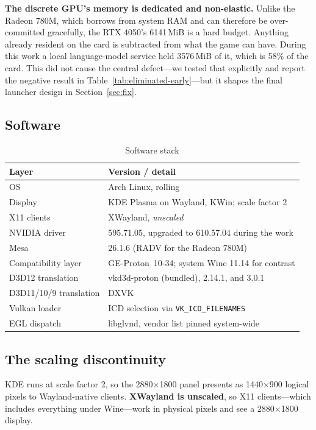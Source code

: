 \textbf{The discrete GPU's memory is dedicated and non-elastic.} Unlike the
Radeon 780M, which borrows from system RAM and can therefore be over-committed
gracefully, the RTX 4050's 6141\,MiB is a hard budget. Anything already resident
on the card is subtracted from what the game can have. During this work a local
language-model service held 3576\,MiB of it, which is 58\% of the card. This did
not cause the central defect---we tested that explicitly and report the negative
result in Table~\ref{tab:eliminated-early}---but it shapes the final launcher
design in Section~\ref{sec:fix}.

\subsection{Software}

\begin{table}[htbp]
\caption{Software stack}
\label{tab:sw}
\centering
\footnotesize
\begin{tabularx}{\columnwidth}{@{}lX@{}}
\toprule
\textbf{Layer} & \textbf{Version / detail} \\
\midrule
OS & Arch Linux, rolling \\
Display & KDE Plasma on Wayland, KWin; scale factor 2 \\
X11 clients & XWayland, \emph{unscaled} \\
NVIDIA driver & 595.71.05, upgraded to 610.57.04 during the work \\
Mesa & 26.1.6 (RADV for the Radeon 780M) \\
Compatibility layer & GE-Proton~10-34; system Wine 11.14 for contrast \\
D3D12 translation & vkd3d-proton (bundled), 2.14.1, and 3.0.1 \\
D3D11/10/9 translation & DXVK \\
Vulkan loader & ICD selection via \verb|VK_ICD_FILENAMES| \\
EGL dispatch & libglvnd, vendor list pinned system-wide \\
\bottomrule
\end{tabularx}
\end{table}

\subsection{The scaling discontinuity}

KDE runs at scale factor 2, so the 2880$\times$1800 panel presents as
1440$\times$900 logical pixels to Wayland-native clients. \textbf{XWayland is
unscaled}, so X11 clients---which includes everything under Wine---work in
physical pixels and see a 2880$\times$1800 display.

